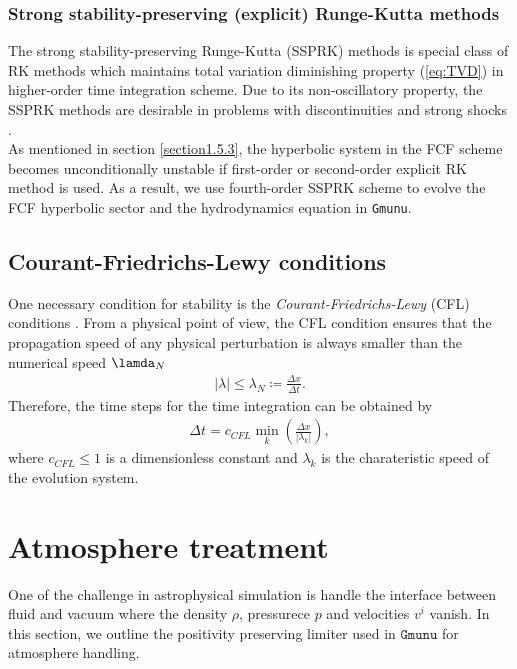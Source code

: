 \subsubsection{Strong stability-preserving (explicit) Runge-Kutta methods}
The strong stability-preserving Runge-Kutta (SSPRK) methods \cite{shu1988total,shu1988efficient}
is special class of RK methods which maintains total variation diminishing property (\ref{eq:TVD})
in higher-order time integration scheme.
Due to its non-oscillatory property,
the SSPRK methods are desirable in problems with discontinuities and strong shocks \cite{hesthaven2007nodal}.\\
As mentioned in section \ref{section1.5.3},
the hyperbolic system in the FCF scheme becomes unconditionally unstable
if first-order or second-order explicit RK method is used.
As a result, we use fourth-order SSPRK scheme to evolve the FCF hyperbolic sector 
and the hydrodynamics equation in \texttt{Gmunu}.

\subsection{Courant-Friedrichs-Lewy conditions}
One necessary condition for stability is the \textit{Courant-Friedrichs-Lewy} (CFL) conditions \cite{courant1928partiellen}.
From a physical point of view,
the CFL condition ensures that the propagation speed of any physical perturbation
is always smaller than the numerical speed $\lamda_N$
\begin{align}
    |\lambda| \leq \lambda_N \coloneqq \frac{\Delta x}{\Delta t}.
\end{align}
Therefore, the time steps for the time integration can be obtained by
\begin{align}
    \Delta t = c_{CFL} \min_k \left(\frac{\Delta x}{|\lambda_k|} \right),
\end{align}
where $c_{CFL}\leq 1$ is a dimensionless constant
and $\lambda_k$ is the charateristic speed of the evolution system.

\section{Atmosphere treatment}
One of the challenge in astrophysical simulation is handle the interface between fluid and vacuum
where the density $\rho$, pressurece $p$ and velocities $v^i$ vanish.
In this section, we outline the positivity preserving limiter \cite{hu2013positivity,cheong2020gmunu_amr} used in $\texttt{Gmunu}$
for atmosphere handling.

